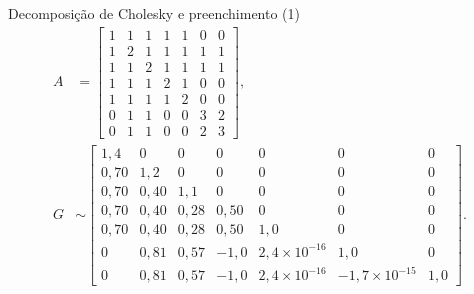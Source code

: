 \documentclass[10pt]{beamer}
\begin{document}
\begin{frame}{Decomposição de Cholesky e preenchimento (1)}
  \begin{align*}
      A &= \begin{bmatrix}
          1 & 1 & 1 & 1 & 1 & 0 & 0 \\
          1 & 2 & 1 & 1 & 1 & 1 & 1 \\
          1 & 1 & 2 & 1 & 1 & 1 & 1 \\
          1 & 1 & 1 & 2 & 1 & 0 & 0 \\
          1 & 1 & 1 & 1 & 2 & 0 & 0 \\
          0 & 1 & 1 & 0 & 0 & 3 & 2 \\
          0 & 1 & 1 & 0 & 0 & 2 & 3
      \end{bmatrix}, \\
      G &\sim \begin{bmatrix}
          1,4 & 0   & 0   &  0    & 0                   &  0                   &  0   \\
          0,70& 1,2 & 0   &  0    & 0                   &  0                   &  0   \\
          0,70& 0,40& 1,1 &  0    & 0                   &  0                   &  0   \\
          0,70& 0,40& 0,28&  0,50 & 0                   &  0                   &  0   \\
          0,70& 0,40& 0,28&  0,50 & 1,0                 &  0                   &  0   \\
          0   & 0,81& 0,57& -1,0  & 2,4 \times 10^{-16} &  1,0                 &  0   \\
          0   & 0,81& 0,57& -1,0  & 2,4 \times 10^{-16} & -1,7 \times 10^{-15} &  1,0
      \end{bmatrix}.
  \end{align*}
\end{frame}
\end{document}
